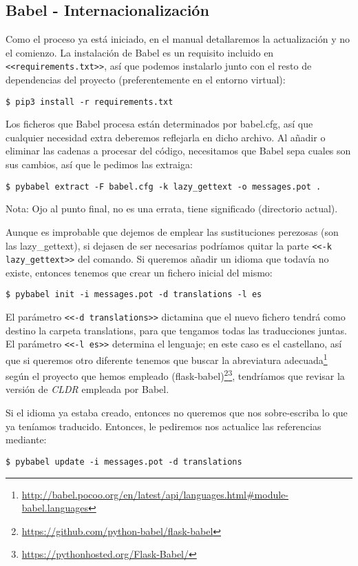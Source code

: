 \subsection{Babel - Internacionalización}
Como el proceso ya está iniciado, en el manual detallaremos la actualización y no el comienzo.
La instalación de Babel es un requisito incluido en \texttt{<<requirements.txt>>}, así que podemos instalarlo junto con el resto de dependencias del proyecto (preferentemente en el entorno virtual):

\noindent\verb|$ pip3 install -r requirements.txt|

Los ficheros que Babel procesa están determinados por babel.cfg, así que cualquier necesidad extra deberemos reflejarla en dicho archivo.
Al añadir o eliminar las cadenas a procesar del código, necesitamos que Babel sepa cuales son sus cambios, así que le pedimos las extraiga:

\noindent\verb|$ pybabel extract -F babel.cfg -k lazy_gettext -o messages.pot .|

Nota: Ojo al punto final, no es una errata, tiene significado (directorio actual).

Aunque es improbable que dejemos de emplear las sustituciones perezosas (son las lazy\_gettext), si dejasen de ser necesarias podríamos quitar la parte \texttt{<<-k lazy\_gettext>>} del comando.
Si queremos añadir un idioma que todavía no existe, entonces tenemos que crear un fichero inicial del mismo:

\noindent\verb|$ pybabel init -i messages.pot -d translations -l es|

El parámetro \texttt{<<-d translations>>} dictamina que el nuevo fichero tendrá como destino la carpeta translations, para que tengamos todas las traducciones juntas.
El parámetro \texttt{<<-l es>>} determina el lenguaje; en este caso es el castellano, así que si queremos otro diferente tenemos que buscar la abreviatura adecuada\footnote{\url{http://babel.pocoo.org/en/latest/api/languages.html\#module-babel.languages}} según el proyecto que hemos empleado (flask-babel)\footnote{\url{https://github.com/python-babel/flask-babel}}\footnote{\url{https://pythonhosted.org/Flask-Babel/}}, tendríamos que revisar la versión de \textit{CLDR} empleada por Babel.

Si el idioma ya estaba creado, entonces no queremos que nos sobre-escriba lo que ya teníamos traducido. Entonces, le pediremos nos actualice las referencias mediante:

\noindent\verb|$ pybabel update -i messages.pot -d translations|

